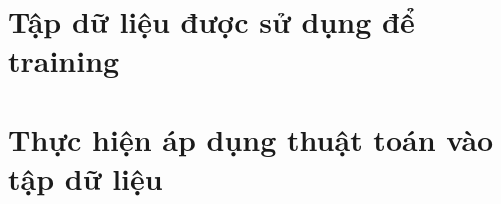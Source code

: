 \documentclass[../main-report.tex]{subfiles}
\begin{document}
\section{Tập dữ liệu được sử dụng để training}

\section{Thực hiện áp dụng thuật toán vào tập dữ liệu}
\end{document}
